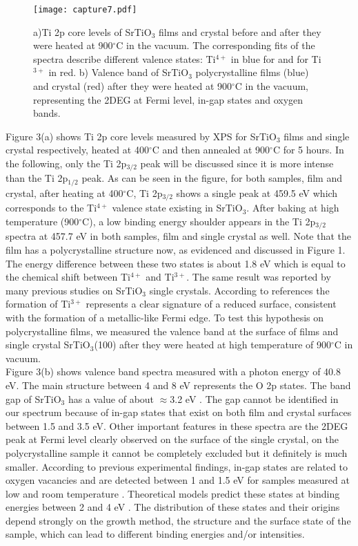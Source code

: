\documentclass{aip-cp}
\begin{document}
\begin{figure}[h!]
	\centerline{\texttt{[image: capture7.pdf]}}
	\caption{a)Ti 2p core levels of SrTiO$_{3}$ films and crystal before and after they were heated at 900$^{\circ}$C in the vacuum. The corresponding fits of the spectra describe different valence states: Ti$^{4+}$ in blue for and for Ti$^{3+}$ in red. b) Valence band of SrTiO$_{3}$ polycrystalline films (blue) and crystal (red) after they were heated at 900$^{\circ}$C in the vacuum, representing the 2DEG at Fermi level, in-gap states and oxygen bands.}  
\end{figure}                   
Figure 3(a) shows Ti 2p core levels measured by XPS for SrTiO$_{3}$ films and single crystal respectively, heated  at 400$^{\circ}$C and then annealed at 900$^{\circ}$C for 5 hours. In the following, only the Ti 2p$_{3/2}$ peak will be discussed since it is more intense than the Ti 2p$_{1/2}$ peak. As can be seen in the figure, for both samples, film and crystal, after heating at 400$^{\circ}$C, Ti 2p$_{3/2}$ shows a single peak at 459.5 eV which corresponds to the Ti$^{4+}$ valence state existing in SrTiO$_{3}$. After baking at high temperature (900$^{\circ}$C), a low binding energy shoulder appears in the Ti 2p$_{3/2}$ spectra at 457.7 eV in both samples, film and single crystal as well. Note that the film has a polycrystalline structure now, as evidenced and discussed in Figure 1. The energy difference between these two states is about 1.8 eV which is equal to the chemical shift between Ti$^{4+}$ and Ti$^{3+}$. The same result was reported by many previous studies on SrTiO$_{3}$ single crystals. According to references \cite{bib8,bib16} the formation of Ti$^{3+}$ represents a clear signature of a reduced surface, consistent with the formation of a metallic-like Fermi edge. 
To test this hypothesis on polycrystalline films, we measured the valence band at the surface of films and single crystal SrTiO$_{3}$(100) after they were heated at high temperature of 900$^{\circ}$C in vacuum. 
\\Figure 3(b) shows valence band spectra measured with a photon energy of 40.8 eV. The main structure between 4 and 8 eV represents the O 2p states. The band gap of SrTiO$_{3}$ has a value of about $\approx$3.2 eV \cite{bib6,bib8}. The gap cannot be identified in our spectrum because of in-gap states that exist on both film and crystal surfaces between 1.5 and 3.5 eV. Other important features in these spectra are the 2DEG peak at Fermi level clearly observed on the surface of the single crystal, on the polycrystalline sample it cannot be completely excluded but it definitely is much smaller. According to previous experimental findings, in-gap states are related to oxygen vacancies and are detected between 1 and 1.5 eV for samples measured at low and room temperature \cite{bib6,bib8,bib9}. Theoretical models predict these states at binding energies between 2 and 4 eV \cite{bib17}. The distribution of these states and their origins depend strongly on the growth method, the structure and the surface state of the sample, which can lead to different binding energies and/or intensities. 
\end{document}
